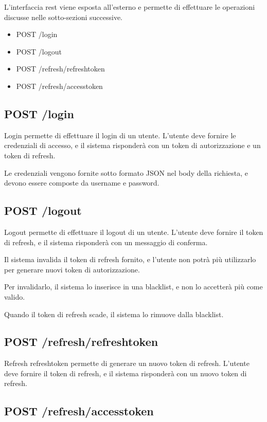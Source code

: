 L'interfaccia rest viene esposta all'esterno e permette di effettuare le operazioni discusse nelle sotto-sezioni successive.

\begin{itemize}
    \item POST /login
    \item POST /logout
    \item POST /refresh/refreshtoken
    \item POST /refresh/accesstoken
\end{itemize}

\subsection{POST /login}

Login permette di effettuare il login di un utente. L'utente deve fornire le credenziali di accesso, e il sistema risponderà con un token di autorizzazione e un token di refresh.

Le credenziali vengono fornite sotto formato JSON nel body della richiesta, e devono essere composte da username e password.


\subsection{POST /logout}

Logout permette di effettuare il logout di un utente. L'utente deve fornire il token di refresh, e il sistema risponderà con un messaggio di conferma.

Il sistema invalida il token di refresh fornito, e l'utente non potrà più utilizzarlo per generare nuovi token di autorizzazione.

Per invalidarlo, il sistema lo inserisce in una blacklist, e non lo accetterà più come valido.

Quando il token di refresh scade, il sistema lo rimuove dalla blacklist.

\subsection{POST /refresh/refreshtoken}

Refresh refreshtoken permette di generare un nuovo token di refresh. L'utente deve fornire il token di refresh, e il sistema risponderà con un nuovo token di refresh.

\subsection{POST /refresh/accesstoken}

